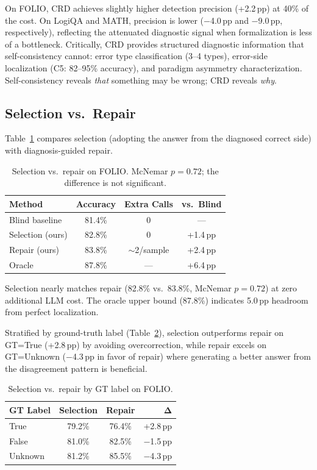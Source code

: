 \documentclass[11pt,a4paper]{article}
\newcommand{\method}{CRD}
\newcommand{\pp}{\,pp}
\begin{document}
On FOLIO, \method{} achieves slightly higher detection precision (+2.2\pp{}) at 40\% of the cost.
On LogiQA and MATH, precision is lower ($-$4.0\pp{} and $-$9.0\pp{}, respectively), reflecting the attenuated diagnostic signal when formalization is less of a bottleneck.
Critically, \method{} provides structured diagnostic information that self-consistency cannot: error type classification (3--4 types), error-side localization (C5: 82--95\% accuracy), and paradigm asymmetry characterization.
Self-consistency reveals \emph{that} something may be wrong; \method{} reveals \emph{why}.

\subsection{Selection vs.\ Repair}
\label{sec:selection-repair}

Table~\ref{tab:sel-rep} compares selection (adopting the answer from the diagnosed correct side) with diagnosis-guided repair.

\begin{table}[t]
\centering
\small
\begin{tabular}{lccc}
\toprule
\textbf{Method} & \textbf{Accuracy} & \textbf{Extra Calls} & \textbf{vs.\ Blind} \\
\midrule
Blind baseline & 81.4\% & 0 & --- \\
Selection (ours) & 82.8\% & 0 & +1.4\pp{} \\
Repair (ours) & 83.8\% & ${\sim}$2/sample & +2.4\pp{} \\
Oracle & 87.8\% & --- & +6.4\pp{} \\
\bottomrule
\end{tabular}
\caption{Selection vs.\ repair on FOLIO. McNemar $p{=}0.72$; the difference is not significant.}
\label{tab:sel-rep}
\end{table}

Selection nearly matches repair (82.8\% vs.\ 83.8\%, McNemar $p{=}0.72$) at zero additional LLM cost.
The oracle upper bound (87.8\%) indicates 5.0\pp{} headroom from perfect localization.

Stratified by ground-truth label (Table~\ref{tab:sel-rep-gt}), selection outperforms repair on GT=True (+2.8\pp{}) by avoiding overcorrection, while repair excels on GT=Unknown ($-$4.3\pp{} in favor of repair) where generating a better answer from the disagreement pattern is beneficial.

\begin{table}[t]
\centering
\small
\begin{tabular}{lccr}
\toprule
\textbf{GT Label} & \textbf{Selection} & \textbf{Repair} & $\boldsymbol{\Delta}$ \\
\midrule
True & 79.2\% & 76.4\% & +2.8\pp{} \\
False & 81.0\% & 82.5\% & $-$1.5\pp{} \\
Unknown & 81.2\% & 85.5\% & $-$4.3\pp{} \\
\bottomrule
\end{tabular}
\caption{Selection vs.\ repair by GT label on FOLIO.}
\label{tab:sel-rep-gt}
\end{table}
\end{document}
